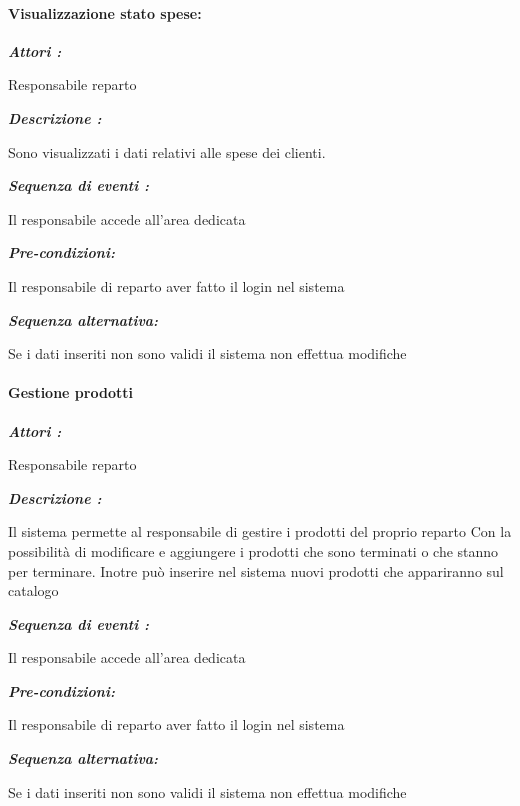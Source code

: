 \documentclass{article}
\begin{document}
\paragraph{Visualizzazione stato spese:}
\begin{mdframed}

	\noindent\textit{\textbf{Attori :}}


	Responsabile reparto

	\noindent\textit{\textbf{Descrizione :}}


	Sono visualizzati i dati relativi alle spese dei clienti.

	\noindent\textit{\textbf{Sequenza di eventi :}}


	Il responsabile accede all'area dedicata

	\noindent\textit{\textbf{Pre-condizioni:}}


	Il responsabile di reparto aver fatto il login nel sistema


	\noindent\textit{\textbf{Sequenza alternativa:}}


	Se i dati inseriti non sono validi il sistema non effettua modifiche

\end{mdframed}

\paragraph{Gestione prodotti}

\begin{mdframed}

	\noindent\textit{\textbf{Attori :}}


	Responsabile reparto

	\noindent\textit{\textbf{Descrizione :}}


	Il sistema permette al responsabile di gestire i prodotti del proprio reparto
	Con la possibilità di modificare e aggiungere i prodotti che sono terminati o che stanno
	per terminare.
	Inotre può inserire nel sistema nuovi prodotti che appariranno sul catalogo

	\noindent\textit{\textbf{Sequenza di eventi :}}


	Il responsabile accede all'area dedicata

	\noindent\textit{\textbf{Pre-condizioni:}}


	Il responsabile di reparto aver fatto il login nel sistema

	\noindent\textit{\textbf{Sequenza alternativa:}}


	Se i dati inseriti non sono validi il sistema non effettua modifiche
\end{mdframed}
\end{document}
